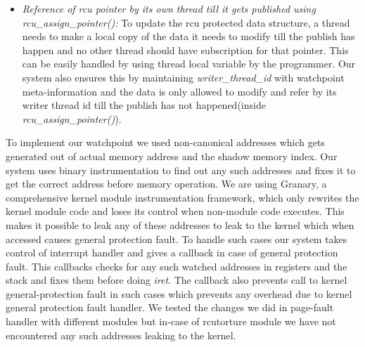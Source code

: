 \begin {itemize}
	\item \emph{ Reference of rcu pointer by its own thread till it gets published using \emph{rcu\_assign\_pointer()}:} To update the rcu protected data structure, a thread needs to make a local copy of the data it needs to modify till the publish has happen and no other thread should have subscription for that pointer. This can be easily handled by using thread local variable by the programmer. Our system also ensures this by maintaining \emph{writer\_thread\_id} with watchpoint meta-information and the data is only allowed to modify and refer by its writer thread id till the publish has not happened(inside \emph{rcu\_assign\_pointer()}).
\end{itemize}


To implement our watchpoint we used non-canonical addresses which gets generated out of actual memory address and the shadow memory index. Our system uses binary instrumentation to find out any such addresses and fixes it to get the correct address before memory operation. We are using Granary, a comprehensive kernel module instrumentation framework, which only rewrites the kernel module code and loses its control when non-module code executes. This makes it possible to leak any of these addresses to leak to the kernel which when accessed causes general protection fault. To handle such cases our system takes control of interrupt handler and gives a callback in case of general protection fault. This callbacks checks for any such watched addresses in registers and the stack and fixes them before doing \emph{iret}. The callback also prevents call to kernel general-protection fault in such cases which prevents any overhead due to kernel general protection fault handler. We tested the changes we did in page-fault handler with different modules but in-case of rcutorture module we have not encountered any such addresses leaking to the kernel.
